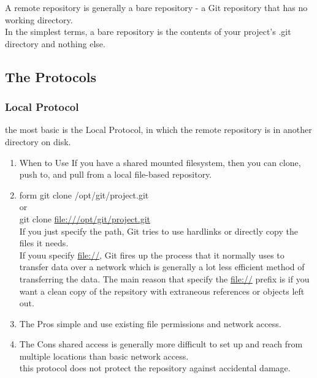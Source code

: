 \documentclass[11pt]{article}
\begin{document}
A remote repository is generally a bare repository - a Git repository that has no working directory.\\
In the simplest terms, a bare repository is the contents of your project's .git directory and nothing else.\\

\subsection{The Protocols}
\label{sec:org7ca4f3a}
\subsubsection{Local Protocol}
\label{sec:org27bac3e}
the most basic is the Local Protocol, in which the remote repository is in another directory on disk.\\
\begin{enumerate}
\item When to Use
\label{sec:org93c9e85}
If you have a shared mounted filesystem, then you can clone, push to, and pull from a local file-based repository.\\
\item form
\label{sec:org374e250}
git clone /opt/git/project.git\\
or\\
git clone \url{file:///opt/git/project.git}\\

If you just specify the path, Git tries to use hardlinks or directly copy the files it needs.\\
If youu specify \url{file://}, Git fires up the process that it normally uses to transfer data over a network which is generally a lot less efficient method of transferring the data. The main reason that specify the \url{file://} prefix is if you want a clean copy of the repsitory with extraneous references or objects left out.\\

\item The Pros
\label{sec:orgb222f43}
simple and use existing file permissions and network access.\\

\item The Cons
\label{sec:orge99a739}
shared access is generally more difficult to set up and reach from multiple locations than basic network access.\\
this protocol does not protect the repository against accidental damage.\\
\end{enumerate}
\end{document}
